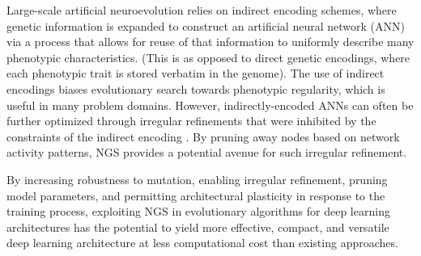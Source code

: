 Large-scale artificial neuroevolution relies on indirect encoding schemes, where genetic information is expanded to construct an artificial neural network (ANN) via a process that allows for reuse of that information to uniformly describe many phenotypic characteristics.
(This is as opposed to direct genetic encodings, where each phenotypic trait is stored verbatim in the genome).
The use of indirect encodings biases evolutionary search towards phenotypic regularity, which is useful in many problem domains.
However, indirectly-encoded ANNs can often be further optimized through irregular refinements that were inhibited by the constraints of the indirect encoding \cite{clune2011performance}.
By pruning away nodes based on network activity patterns, NGS provides a potential avenue for such irregular refinement.

By increasing robustness to mutation, enabling irregular refinement, pruning model parameters, and permitting architectural plasticity in response to the training process, exploiting NGS in evolutionary algorithms for deep learning architectures has the potential to yield more effective, compact, and versatile deep learning architecture at less computational cost than existing approaches.
